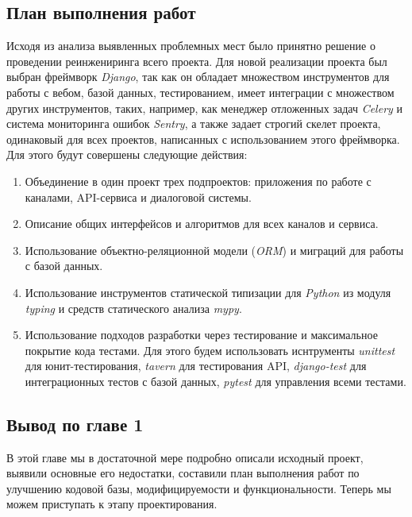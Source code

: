     \subsection{План выполнения работ}
    Исходя из анализа выявленных проблемных мест было принятно решение о проведении реинжениринга всего проекта.
    Для новой реализации проекта был выбран фреймворк \textit{Django}, так как он обладает множеством инструментов
    для работы с вебом, базой данных, тестированием, имеет интеграции с множеством других инструментов, таких, например,
    как менеджер отложенных задач \textit{Celery} и система мониторинга ошибок \textit{Sentry},
    а также задает строгий скелет проекта, одинаковый для всех проектов, написанных с использованием этого фреймворка.
    Для этого будут совершены следующие действия:
    \begin{enumerate}
        \item Объединение в один проект трех подпроектов: приложения по работе с каналами, API-сервиса и диалоговой системы.
        \item Описание общих интерфейсов и алгоритмов для всех каналов и сервиса.
        \item Использование объектно-реляционной модели (\textit{ORM}) и миграций для работы с базой данных.
        \item Использование инструментов статической типизации для \textit{Python} из модуля \textit{typing}
        и средств статического анализа \textit{mypy}.
        \item Использование подходов разработки через тестирование и максимальное покрытие кода тестами. Для этого
        будем использовать иснтрументы \textit{unittest} для юнит-тестирования, \textit{tavern} для тестирования API,
        \textit{django-test} для интеграционных тестов с базой данных, \textit{pytest} для управления всеми тестами.
    \end{enumerate}

    \subsection*{Вывод по главе 1}
    В этой главе мы в достаточной мере подробно описали исходный проект, выявили основные его
    недостатки, составили план выполнения работ по улучшению кодовой базы, модифицируемости
    и функциональности. Теперь мы можем приступать к этапу проектирования.

